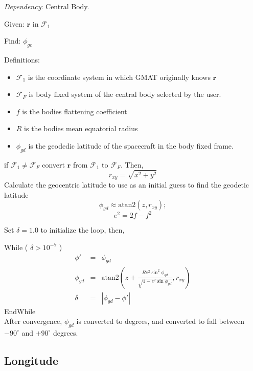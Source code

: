 \noindent \textit{Dependency}:  Central Body.

\noindent Given:  $\mathbf{r}$ in $\mathcal{F}_1$

\noindent Find:  $\phi_{gc}$

\noindent Definitions:
\begin{itemize}
     \item $\mathcal{F}_1$ is the coordinate system in which GMAT originally knows $\mathbf{r}$
     \item $\mathcal{F}_F$ is body fixed system of the central body selected by the user.
     \item $f$ is the bodies flattening coefficient
     \item $R$ is the bodies mean equatorial radius
     \item $\phi_{gd}$ is the geodedic latitude of the spacecraft
     in the body fixed frame.
\end{itemize}
%
if $\mathcal{F}_1 \neq \mathcal{F}_F$ convert $\mathbf{r}$ from
$\mathcal{F}_1$ to $\mathcal{F}_F$. Then,
%
\begin{equation}
     r_{xy} = \sqrt{ x^2 + y^2 }
\end{equation}
%
Calculate the geocentric latitude to use as an initial guess to find
the geodetic latitude
%
\begin{equation}
     \phi_{gd}  \approx \mbox{atan2}(z,  r_{xy}  );
\end{equation}
%
\begin{equation}
    e^2 = 2f-f^2
\end{equation}
%

\noindent Set $\delta = 1.0$ to initialize the loop, then,


\noindent While ( $\delta > 10^{-7}$ )
%
\begin{eqnarray}
   \phi' & = & \phi_{gd}\\
   \phi_{gd} & = & \mbox{atan2}\left(z +  \frac{Re^2\sin^{2}{\phi_{gd}}} { \sqrt{1 - e^2\sin{\phi_{gd}}} }, r_{xy}
   \right)\\
   \delta & = & | \phi_{gd} - \phi' |
\end{eqnarray}
%
EndWhile\\
%

After convergence, $\phi_{gd}$ is converted to degrees, and
converted to fall between $-90^\circ$ and   $+90^\circ$ degrees.

\subsection{Longitude} \label{Sec:CalcObjectLongitude}

